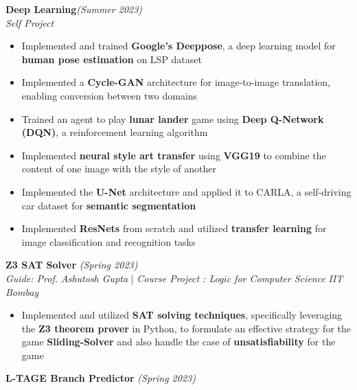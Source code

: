 \documentclass[a4paper,10pt]{article}
\begin{document}
\vspace{\baselineskip}
\vspace{-25pt}
\noindent\textbf{\large Deep Learning}\hfill{\sl \small (Summer 2023)}\\
{\it Self Project}
\\\vspace{-15pt}
\begin{itemize}[itemsep = -0.65 mm, leftmargin=*]
    \item Implemented and trained \textbf{Google's Deeppose}, a deep learning model for \textbf{human pose estimation} on LSP dataset
    \item Implemented a \textbf{Cycle-GAN} architecture for image-to-image translation, enabling conversion between two domains 
    \item Trained an agent to play \textbf{lunar lander} game using \textbf{Deep Q-Network (DQN)}, a reinforcement learning algorithm
    \item Implemented \textbf{neural style art transfer} using \textbf{VGG19} to combine the content of one image with the style of another
    \item Implemented the \textbf{U-Net} architecture and applied it to CARLA, a self-driving car dataset for \textbf{semantic segmentation}
    \item Implemented \textbf{ResNets} from scratch and utilized \textbf{transfer learning} for image classification and recognition tasks
\end{itemize}
\vspace{\baselineskip}
\vspace{-15pt}
\noindent\textbf{\large Z3 SAT Solver} \hfill{\sl \small (Spring 2023)}\\
{\it Guide: Prof. Ashutosh Gupta} $|$ {\it Course Project : Logic for Computer Science } \hfill{\it IIT Bombay}
\vspace{-2pt}
\begin{itemize}[itemsep = -0.65 mm, leftmargin=*]
    \item Implemented and utilized \textbf{SAT solving techniques}, specifically leveraging the \textbf{Z3 theorem prover} in Python, to formulate an effective strategy for the game \textbf{Sliding-Solver} and also handle the case of \textbf{unsatisfiability} for the game
\end{itemize}
\vspace{\baselineskip}
\vspace{-15pt}
\noindent\textbf{\large L-TAGE Branch Predictor} \hfill{\sl \small (Spring 2023)}\\
\end{document}
